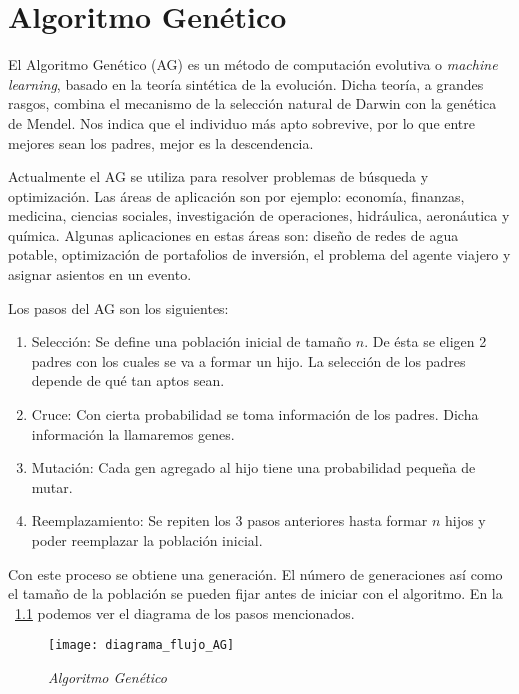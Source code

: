 \chapter{Algoritmo Genético}

El Algoritmo Genético (AG) es un método de computación evolutiva o \textit{machine learning}, basado en la teoría sintética de la evolución. Dicha teoría, a grandes rasgos, combina el mecanismo de la selección natural de Darwin con la genética de Mendel. Nos indica que el individuo más apto sobrevive, por lo que entre mejores sean los padres, mejor es la descendencia.

Actualmente el AG se utiliza para resolver problemas de búsqueda y optimización. Las áreas de aplicación son por ejemplo: economía, finanzas, medicina, ciencias sociales, investigación de operaciones, hidráulica, aeronáutica y química. Algunas aplicaciones en estas áreas son: diseño de redes de agua potable, optimización de portafolios de inversión, el problema del agente viajero y asignar asientos en un evento.

Los pasos del AG son los siguientes:

\begin{enumerate}
\item Selección: Se define una población inicial de tamaño $n$. De ésta se eligen 2 padres con los cuales se va a formar un hijo. La selección de los padres depende de qué tan aptos sean.

\item Cruce: Con cierta probabilidad se toma información de los padres. Dicha información la llamaremos genes.

\item Mutación: Cada gen agregado al hijo tiene una probabilidad pequeña de mutar.

\item Reemplazamiento: Se repiten los 3 pasos anteriores hasta formar $n$ hijos y poder reemplazar la población inicial.
\end{enumerate}

Con este proceso se obtiene una generación. El número de generaciones así como el tamaño de la población se pueden fijar antes de iniciar con el algoritmo. En la \figurename{~\ref{fig_AG}} podemos ver el diagrama de los pasos mencionados.

\begin{figure}[H]
\centering
\texttt{[image: diagrama\_flujo\_AG]} %
\caption{\textit{Algoritmo Genético}}\label{fig_AG}
\end{figure}

